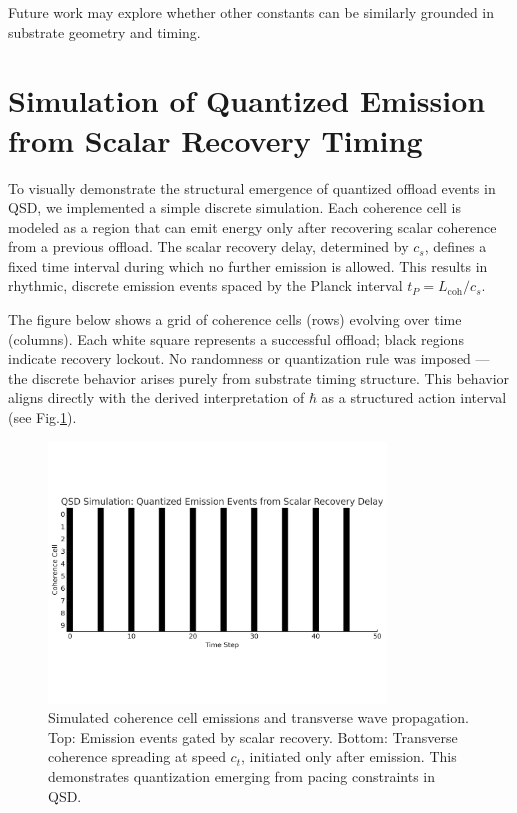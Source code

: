 \documentclass[ht-mathphys]{ht-fmt}
\theoremstyle{thmstyleone}%
\theoremstyle{thmstyletwo}%
\theoremstyle{thmstylethree}%
\begin{document}
Future work may explore whether other constants can be similarly grounded in substrate geometry and timing.

\section{Simulation of Quantized Emission from Scalar Recovery Timing}
\label{app:qsd_sim}
To visually demonstrate the structural emergence of quantized offload events in QSD, we implemented a simple discrete simulation. Each coherence cell is modeled as a region that can emit energy only after recovering scalar coherence from a previous offload. The scalar recovery delay, determined by $c_s$, defines a fixed time interval during which no further emission is allowed. This results in rhythmic, discrete emission events spaced by the Planck interval $t_P = L_{\text{coh}} / c_s$.

The figure below shows a grid of coherence cells (rows) evolving over time (columns). Each white square represents a successful offload; black regions indicate recovery lockout. No randomness or quantization rule was imposed — the discrete behavior arises purely from substrate timing structure. This behavior aligns directly with the derived interpretation of $\hbar$ as a structured action interval (see Fig.\ref{fig:qsd_sim}).

\begin{figure}[H]
\label{fig:sim}
    \centering
    \includegraphics[width=0.8\textwidth]{figures/qsd_quantized_emission.pdf}
    \caption{Simulated coherence cell emissions and transverse wave propagation. Top: Emission events gated by scalar recovery. Bottom: Transverse coherence spreading at speed $c_t$, initiated only after emission. This demonstrates quantization emerging from pacing constraints in QSD.}
    \label{fig:qsd_sim}
\end{figure}
\end{document}
